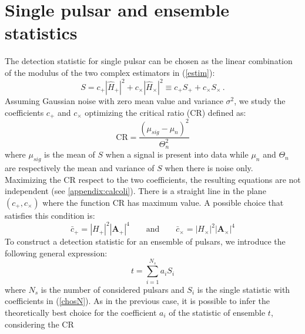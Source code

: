 \documentclass[11pt,a4paper,final]{iopart}
\begin{document}
\section{Single pulsar and ensemble statistics}\label{tre}
The detection statistic for single pulsar can be chosen as the linear combination of the modulus of the two complex estimators in (\ref{estim}):\begin{equation}\label{thstat}
S=c_+ |\hat{H}_+|^2 +c_\times |\hat{H}_\times|^2\equiv c_+ S_+ + c_\times S_\times \,.
\end{equation}
Assuming Gaussian noise with zero mean value and variance $\sigma^2$, we study the coefficients $c_+$ and $c_\times$ optimizing the critical ratio ($\textrm{CR}$) defined as:
\begin{equation}\label{CRS}
\textrm{CR}=\frac{(\mu_{sig}-\mu_{n})^2}{\Theta^2_{n}}
\end{equation} where $\mu_{sig}$ is the mean of $S$ when a signal is present into data while $\mu_{n}$ and $\Theta_{n}$ are respectively the mean and variance of $S$ when there is noise only.
\\Maximizing the $\textrm{CR}$ respect to the two coefficients, the resulting equations are not independent (see \ref{appendix:calcoli}). There is a straight line in the plane $(c_+,c_\times)$ where the function $\textrm{CR}$ has maximum value. 
A possible choice that satisfies this condition is:
\begin{equation}\label{chosN}
\bar{c}_+=|H_+|^2|\textbf{A}_+|^4 \qquad \text{and} \qquad \bar{c}_\times=|H_\times|^2|\textbf{A}_\times|^4
\end{equation}
To construct a detection statistic for an ensemble of pulsars, we introduce the following general expression:
\begin{equation}\label{tstat}
t=\sum_{i=1}^{N_s} a_i S_i
\end{equation}where $N_s$ is the number of considered pulsars and $S_i$ is the single statistic with coefficients in (\ref{chosN}). 
As in the previous case, it is possible to infer the theoretically best choice for the coefficient $a_i$ of the statistic of ensemble $t$, considering the $\textrm{CR}$ 
\end{document}
